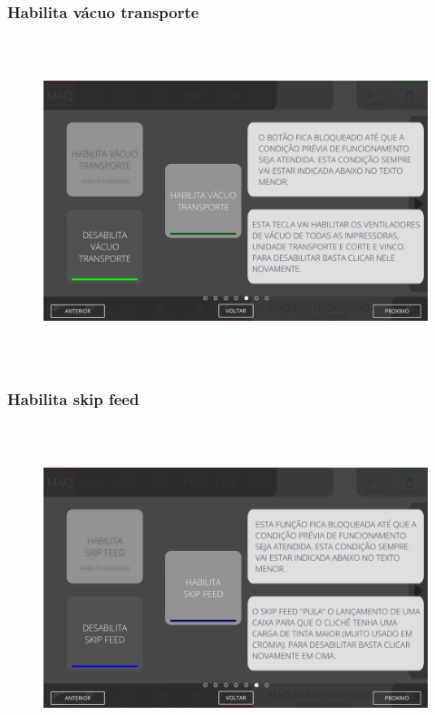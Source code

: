 \vspace*{\fill}

\newpage
\thispagestyle{fancy}

\vspace*{\fill}

\subsubsection{\small{Habilita vácuo transporte}}

\begin{figure}[h]
  \centering
  \includegraphics[width=576px,height=360px]{src/imagesFlexo/02-machine/e-5.png}
\end{figure}

\vspace*{\fill}

\newpage
\thispagestyle{fancy}

\vspace*{\fill}

\subsubsection{\small{Habilita skip feed}}

\begin{figure}[h]
  \centering
  \includegraphics[width=576px,height=360px]{src/imagesFlexo/02-machine/e-6.png}
\end{figure}

